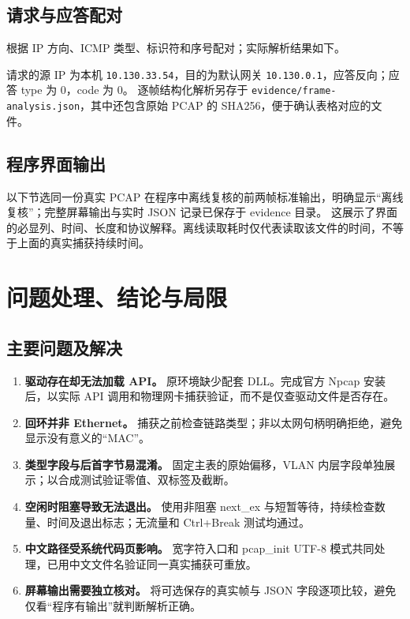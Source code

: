 \documentclass[UTF8,notitlepage,11pt]{ctexart}
\newcommand{\src}[1]{\nolinkurl{#1}}
\begin{document}
\subsection{请求与应答配对}
根据 IP 方向、ICMP 类型、标识符和序号配对；实际解析结果如下。
\begin{table}[H]\centering\small\caption{六个真实帧的网络层及 ICMP 解释}

\end{table}
请求的源 IP 为本机 \src{10.130.33.54}，目的为默认网关 \src{10.130.0.1}，应答反向；应答 type 为 0，code 为 0。
逐帧结构化解析另存于 \src{evidence/frame-analysis.json}，其中还包含原始 PCAP 的 SHA256，便于确认表格对应的文件。

\noindent\begin{minipage}{\textwidth}
\subsection{程序界面输出}
以下节选同一份真实 PCAP 在程序中离线复核的前两帧标准输出，明确显示“离线复核”；完整屏幕输出与实时 JSON 记录已保存于 evidence 目录。
这展示了界面的必显列、时间、长度和协议解释。离线读取耗时仅代表读取该文件的时间，不等于上面的真实捕获持续时间。
\end{minipage}

\section{问题处理、结论与局限}
\subsection{主要问题及解决}
\begin{enumerate}
\item \textbf{驱动存在却无法加载 API。} 原环境缺少配套 DLL。完成官方 Npcap 安装后，以实际 API 调用和物理网卡捕获验证，而不是仅查驱动文件是否存在。
\item \textbf{回环并非 Ethernet。} 捕获之前检查链路类型；非以太网句柄明确拒绝，避免显示没有意义的“MAC”。
\item \textbf{类型字段与后首字节易混淆。} 固定主表的原始偏移，VLAN 内层字段单独展示；以合成测试验证零值、双标签及截断。
\item \textbf{空闲时阻塞导致无法退出。} 使用非阻塞 next\_ex 与短暂等待，持续检查数量、时间及退出标志；无流量和 Ctrl+Break 测试均通过。
\item \textbf{中文路径受系统代码页影响。} 宽字符入口和 pcap\_init UTF-8 模式共同处理，已用中文文件名验证同一真实捕获可重放。
\item \textbf{屏幕输出需要独立核对。} 将可选保存的真实帧与 JSON 字段逐项比较，避免仅看“程序有输出”就判断解析正确。
\end{enumerate}
\end{document}
